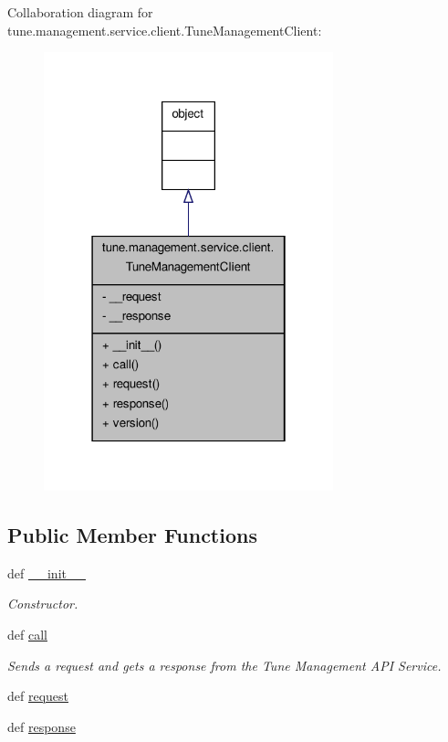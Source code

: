 Collaboration diagram for tune.\-management.\-service.\-client.\-Tune\-Management\-Client\-:
\nopagebreak
\begin{figure}[H]
\begin{center}
\leavevmode
\includegraphics[width=238pt]{classtune_1_1management_1_1service_1_1client_1_1TuneManagementClient__coll__graph}
\end{center}
\end{figure}
\subsection*{Public Member Functions}
\begin{DoxyCompactItemize}
\item 
def \hyperlink{classtune_1_1management_1_1service_1_1client_1_1TuneManagementClient_a05c236fee54396f069efb3608399ec6e}{\-\_\-\-\_\-init\-\_\-\-\_\-}
\begin{DoxyCompactList}\small\item\em Constructor. \end{DoxyCompactList}\item 
def \hyperlink{classtune_1_1management_1_1service_1_1client_1_1TuneManagementClient_a9a6fb9b3cbb0e578a1cd53fb8a39f6a7}{call}
\begin{DoxyCompactList}\small\item\em Sends a request and gets a response from the Tune Management A\-P\-I Service. \end{DoxyCompactList}\item 
def \hyperlink{classtune_1_1management_1_1service_1_1client_1_1TuneManagementClient_a3f6613d4f867a8a6b2a3cba37bda76ad}{request}
\item 
def \hyperlink{classtune_1_1management_1_1service_1_1client_1_1TuneManagementClient_a804a1ffd027e56af5a1983725112048b}{response}
\end{DoxyCompactItemize}
